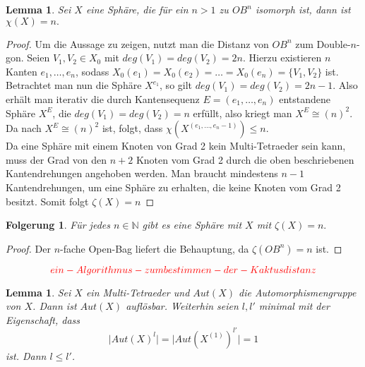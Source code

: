 \documentclass[12pt,titlepage,twoside,cleardoublepage]{article}
\theoremstyle{nummermitklammern}
\newtheorem{lemma}[temp]{Lemma}
\newtheorem{folgerung}[temp]{Folgerung}
\newtheorem{lemma}[zahl]{Lemma}
\newtheorem{folgerung}[zahl]{Folgerung}
\numberwithin{equation}{section}
\begin{document}
\begin{lemma}
Sei $X$ eine Sphäre, die für ein $n>1$ zu $OB^n$ isomorph ist, dann ist $\chi(X)=n.$
\end{lemma}
\begin{proof}
Um die Aussage zu zeigen, nutzt man die Distanz von $OB^n$ zum Double-$n$-gon. Seien $V_1,V_2\in X_0$ mit $deg(V_1)=deg(V_2)=2n$. Hierzu existieren $n$ Kanten $e_1,\ldots,e_n$, sodass $X_0(e_1)=X_0(e_2)=\ldots=X_0(e_n)=\{V_1,V_2\}$ ist.
Betrachtet man nun die Sphäre $X^{e_1}$, so gilt $deg(V_1)=deg(V_2)=2n-1$. Also erhält man iterativ die durch Kantensequenz $E=(e_1,\ldots,e_n)$ entstandene Sphäre $X^E$, die $deg(V_1)=deg(V_2)=n$ erfüllt, also kriegt man $X^E \cong (n)^2$. Da nach  $X^E\cong (n)^2$ ist, folgt, dass $\chi(X^{(e_1,\ldots,e_n-1)})\leq n$. \\
Da eine Sphäre mit einem Knoten von Grad 2 kein Multi-Tetraeder sein kann, muss der Grad von den $n+2$ Knoten vom Grad 2 durch die oben beschriebenen Kantendrehungen angehoben werden. Man braucht mindestens $n-1$ Kantendrehungen, um eine Sphäre zu erhalten, die keine Knoten vom Grad 2 besitzt. Somit folgt $\zeta(X)=n$
\end{proof}
\begin{folgerung}
Für jedes $n \in \mathbb{N}$ gibt es eine Sphäre mit $X$ mit $\zeta(X)=n.$
\end{folgerung}
\begin{proof}
Der $n$-fache Open-Bag liefert die Behauptung, da $\zeta(OB^{n})=n$ ist.
\end{proof}
\[
\textcolor{red}{ein-Algorithmus-zum bestimmen-der-Kaktusdistanz}
\]
\begin{lemma}
Sei $X$ ein Multi-Tetraeder und $Aut(X)$ die Automorphismengruppe von $X$. Dann ist $Aut(X)$ auflösbar.
Weiterhin seien $l,l'$ minimal mit der Eigenschaft, dass
\[
\vert Aut(X)^l\vert=\vert Aut(X^{(1)})^{l'}\vert =1
\] ist. Dann $l\leq l'$.
\end{lemma}
\end{document}
